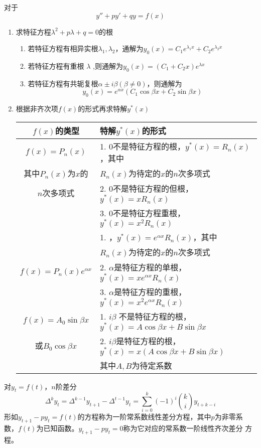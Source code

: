 \documentclass{article}
\begin{document}
对于
\begin{equation*}
y''+py'+qy=f(x)
\end{equation*}
\begin{enumerate}
\item 求特征方程\(\lambda^2+p\lambda+q=0\)的根
\begin{enumerate}
\item 若特征方程有相异实根\(\lambda_1,\lambda_2\)，通解为\(y_0(x)=C_1e^{\lambda_1x}+C_2e^{\lambda_2x}\)
\item 若特征方程有重根 \(\lambda\) ,则通解为\(y_0(x)=(C_1+C_2x)e^{\lambda x}\)
\item 若特征方程有共轭复根\(\alpha\pm i\beta(\beta\neq0)\)，则通解为
\begin{equation*}
y_0(x)=e^{\alpha x}(C_1\cos\beta x+C_2\sin\beta x)
\end{equation*}
\end{enumerate}
\item 根据非齐次项\(f(x)\)的形式再求特解\(y^*(x)\)

\begin{tabular}{|c|l|}
\hline
\(f(x)\)的类型&特解\(y^*(x)\)的形式 \\\hline
\(f(x)=P_n(x)\)&1. 0不是特征方程的根，\(y^*(x)=R_n(x)\)，其中\\
其中\(P_n(x)\)为\(x\)的&\(R_n(x)\)为待定的\(x\)的\(n\)次多项式\\
\(n\)次多项式&2. 0不是特征方程的但根，\(y^*(x)=xR_n(x)\)\\
&3. 0不是特征方程重根，\(y^*(x)=x^2R_n(x)\)\\\hline
&1. ，\(y^*(x)=e^{\alpha x}R_n(x)\)，其中\\
&\(R_n(x)\)为待定的\(x\)的\(n\)次多项式\\
\(f(x)=P_n(x)e^{\alpha x}\)&2. \(\alpha\)是特征方程的单根，\(y^*(x)=xe^{\alpha x}R_n(x)\)\\
&3. \(\alpha\)是特征方程的重根，\(y^*(x)=x^2e^{\alpha x}R_n(x)\)\\\hline
\(f(x)=A_0\sin\beta x\)&1. \(i\beta\) 不是特征方程的根，\(y^*(x)=A\cos\beta x+B\sin\beta x\)\\
或\(B_0\cos\beta x\)&2. \(i\beta\)是特征方程的根，\(y^*(x)=x(A\cos\beta x+B\sin\beta x)\)\\
&其中\(A,B\)为待定系数\\\hline
\end{tabular}
\end{enumerate}



对\(y_t=f(t)\)，\(n\)阶差分
\begin{equation*}
\Delta^ky_t=\Delta^{k-1}y_{t+1}-\Delta^{t-1}y_t=
\sum_{i=0}^k(-1)^i\binom{k}{i}y_{t+k-i}
\end{equation*}
形如\(y_{t+1}-py_t=f(t)\)的方程称为一阶常系数线性差分方程，其中\(p\)为非零系
数，\(f(t)\)为已知函数。\(y_{t+1}-py_t=0\)称为它对应的常系数一阶线性齐次差分
方程。
\end{document}
